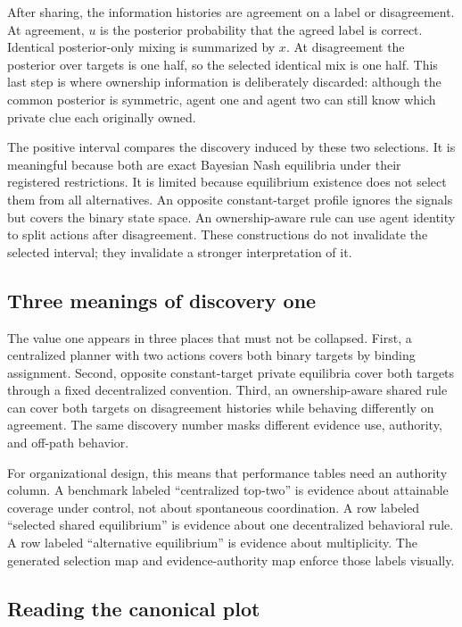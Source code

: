 \documentclass[12pt]{article}
\theoremstyle{definition}
\begin{document}
After sharing, the information histories are agreement on a label or
disagreement. At agreement, $u$ is the posterior probability that the agreed
label is correct. Identical posterior-only mixing is summarized by $x$. At
disagreement the posterior over targets is one half, so the selected identical
mix is one half. This last step is where ownership information is deliberately
discarded: although the common posterior is symmetric, agent one and agent two
can still know which private clue each originally owned.

The positive interval compares the discovery induced by these two selections.
It is meaningful because both are exact Bayesian Nash equilibria under their
registered restrictions. It is limited because equilibrium existence does not
select them from all alternatives. An opposite constant-target profile ignores
the signals but covers the binary state space. An ownership-aware rule can use
agent identity to split actions after disagreement. These constructions do not
invalidate the selected interval; they invalidate a stronger interpretation of
it.

\subsection*{Three meanings of discovery one}

The value one appears in three places that must not be collapsed. First, a
centralized planner with two actions covers both binary targets by binding
assignment. Second, opposite constant-target private equilibria cover both
targets through a fixed decentralized convention. Third, an ownership-aware
shared rule can cover both targets on disagreement histories while behaving
differently on agreement. The same discovery number masks different evidence
use, authority, and off-path behavior.

For organizational design, this means that performance tables need an authority
column. A benchmark labeled ``centralized top-two'' is evidence about attainable
coverage under control, not about spontaneous coordination. A row labeled
``selected shared equilibrium'' is evidence about one decentralized behavioral
rule. A row labeled ``alternative equilibrium'' is evidence about multiplicity.
The generated selection map and evidence-authority map enforce those labels
visually.

\subsection*{Reading the canonical plot}
\end{document}
